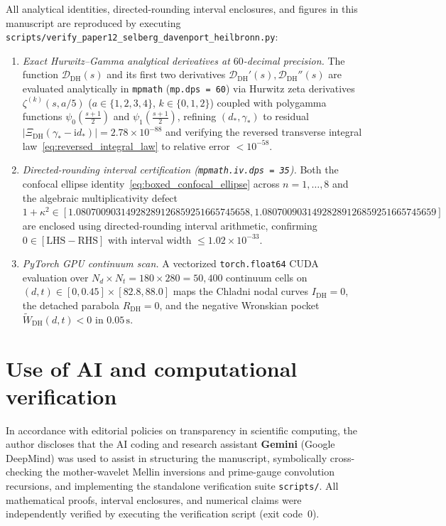 \documentclass[11pt,reqno]{amsart}
\theoremstyle{definition}
\theoremstyle{remark}
\numberwithin{equation}{section}
\newcommand{\ii}{\mathrm{i}}
\newcommand{\DHf}{\mathrm{DH}}
\begin{document}
All analytical identities, directed-rounding interval enclosures, and figures in this manuscript are reproduced by executing \texttt{scripts/}\allowbreak\texttt{verify\_paper12\_}\allowbreak\texttt{selberg\_davenport\_}\allowbreak\texttt{heilbronn.py}:
\begin{enumerate}[label=\textup{(\arabic*)},leftmargin=2.2em]
\item \textit{Exact Hurwitz--Gamma analytical derivatives at $60$-decimal precision.} The function $\mathcal{D}_{\DHf}(s)$ and its first two derivatives $\mathcal{D}_{\DHf}'(s), \mathcal{D}_{\DHf}''(s)$ are evaluated analytically in \texttt{mpmath} (\texttt{mp.dps = 60}) via Hurwitz zeta derivatives $\zeta^{(k)}(s, a/5)$ ($a \in \{1,2,3,4\}$, $k \in \{0,1,2\}$) coupled with polygamma functions $\psi_0(\frac{s+1}{2})$ and $\psi_1(\frac{s+1}{2})$, refining $(d_*, \gamma_*)$ to residual $|\Xi_{\DHf}(\gamma_* - \ii d_*)| = 2.78 \times 10^{-88}$ and verifying the reversed transverse integral law~\eqref{eq:reversed_integral_law} to relative error $< 10^{-58}$.
\item \textit{Directed-rounding interval certification (\texttt{mpmath.iv.dps = 35}).} Both the confocal ellipse identity~\eqref{eq:boxed_confocal_ellipse} across $n = 1, \dots, 8$ and the algebraic multiplicativity defect $1 + \kappa^2 \in [1.08070090314928289126859251665745658, 1.08070090314928289126859251665745659]$ are enclosed using directed-rounding interval arithmetic, confirming $0 \in [\mathrm{LHS} - \mathrm{RHS}]$ with interval width $\le 1.02 \times 10^{-33}$.
\item \textit{PyTorch GPU continuum scan.} A vectorized \texttt{torch.float64} CUDA evaluation over $N_d \times N_t = 180 \times 280 = 50{,}400$ continuum cells on $(d,t) \in [0, 0.45] \times [82.8, 88.0]$ maps the Chladni nodal curves $I_{\DHf} = 0$, the detached parabola $R_{\DHf} = 0$, and the negative Wronskian pocket $\widetilde{W}_{\DHf}(d,t) < 0$ in $0.05\,\mathrm{s}$.
\end{enumerate}

\section*{Use of AI and computational verification}

{\sloppy
In accordance with editorial policies on transparency in scientific computing, the author discloses that the AI coding and research assistant \textbf{Gemini} (Google DeepMind) was used to assist in structuring the manuscript, symbolically cross-checking the mother-wavelet Mellin inversions and prime-gauge convolution recursions, and implementing the standalone verification suite \texttt{scripts/}\allowbreak\texttt{}. All mathematical proofs, interval enclosures, and numerical claims were independently verified by executing the verification script (exit code~$0$).\par}
\end{document}

